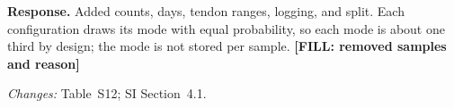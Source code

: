 \textbf{Response.} Added counts, days, tendon ranges, logging, and split. Each configuration draws its mode with equal probability, so each mode is about one third by design; the mode is not stored per sample. \textbf{[FILL: removed samples and reason]}

\textit{Changes:} Table~S12; SI Section~4.1.
